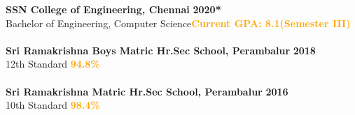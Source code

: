 %
%
%

\begin{Education}
{\bf SSN College of Engineering, Chennai} \hfill {\bf2020*} 
\\ Bachelor of Engineering, Computer Science\hfill \textcolor{Orange}{\bf Current GPA: 8.1(Semester III)}\\\\
{\bf Sri Ramakrishna Boys Matric Hr.Sec School, Perambalur} \hfill {\bf2018}\\
12\nth th Standard \hfill \textcolor{Orange}{\bf 94.8\%}\\\\
{\bf Sri Ramakrishna Matric Hr.Sec School, Perambalur} \hfill {\bf2016}\\
10\nth th Standard \hfill \textcolor{Orange}{\bf98.4\% }\\
\end{Education}

